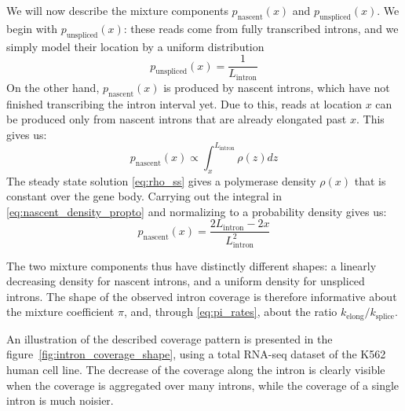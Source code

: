 \documentclass[11pt]{article}
\begin{document}
	We will now describe the mixture components $p_{\mathrm{nascent}}(x)$ and $p_{\mathrm{unspliced}}(x)$. We begin with $p_{\mathrm{unspliced}}(x)$: these reads come from fully transcribed introns, and we simply model their location by a uniform distribution
	\begin{equation} \label{eq:p_unspliced}
	p_{\mathrm{unspliced}}(x) = \frac{1}{L_{\mathrm{intron}}}
	\end{equation}
	On the other hand, $p_{\mathrm{nascent}}(x)$ is produced by nascent introns, which have not finished transcribing the intron interval yet. Due to this, reads at location $x$ can be produced only from nascent introns that are already elongated past $x$. This gives us:
	\begin{equation} \label{eq:nascent_density_propto}
	p_{\mathrm{nascent}}(x)  \propto \int_{x}^{L_{\mathrm{intron}}} \rho (z) dz
	\end{equation}
	The steady state solution \eqref{eq:rho_ss} gives a polymerase density $\rho(x)$ that is constant over the gene body. Carrying out the integral in \eqref{eq:nascent_density_propto} and normalizing to a probability density gives us:
	\begin{equation} \label{eq:p_nascent}
	p_{\mathrm{nascent}}(x) = \frac{2 L_{\mathrm{intron}} -2x}{L_{\mathrm{intron}}^2}
	\end{equation}

	The two mixture components thus have distinctly different shapes: a linearly decreasing density for nascent introns, and a uniform density for unspliced introns. The shape of the observed intron coverage is therefore informative about the mixture coefficient $\pi$, and, through \eqref{eq:pi_rates}, about the ratio $k_\mathrm{elong} / k_\mathrm{splice}$.
	
	An illustration of the described coverage pattern is presented in the figure~\ref{fig:intron_coverage_shape}, using a total RNA-seq dataset of the K562 human cell line. The decrease of the coverage along the intron is clearly visible when the coverage is aggregated over many introns, while the coverage of a single intron is much noisier.
	
\end{document}

